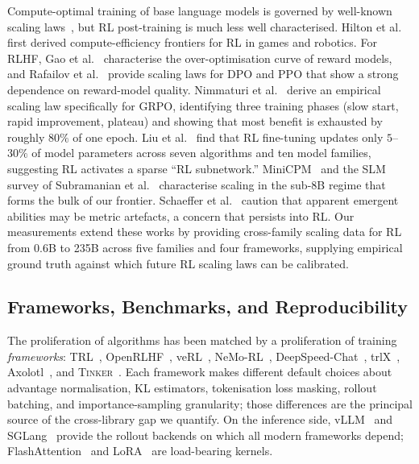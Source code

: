 \documentclass{article}
\newcommand{\tinker}{\textsc{Tinker}}
\begin{document}
Compute-optimal training of base language models is governed by
well-known scaling laws~\cite{kaplan2020scalinglaws, hoffmann2022chinchilla, muennighoff2023datascaling}, but RL post-training is much less well
characterised. Hilton et al.~\cite{hilton2023rlscaling} first derived
compute-efficiency frontiers for RL in games and robotics. For RLHF,
Gao et al.~\cite{gao2023reward} characterise the over-optimisation curve of
reward models, and Rafailov et al.~\cite{rafailov2024rlhfscaling} provide
scaling laws for DPO and PPO that show a strong dependence on reward-model
quality. Nimmaturi et al.~\cite{nimmaturi2025predictive} derive an
empirical scaling law specifically for GRPO, identifying three training
phases (slow start, rapid improvement, plateau) and showing that most
benefit is exhausted by roughly $80\%$ of one epoch. Liu et
al.~\cite{liu2025rlsubnetworks} find that RL fine-tuning updates only
$5$--$30\%$ of model parameters across seven algorithms and ten model
families, suggesting RL activates a sparse ``RL subnetwork.''
MiniCPM~\cite{hu2024minicpm} and the SLM survey of
Subramanian et al.~\cite{subramanian2025slm} characterise scaling in the
sub-8B regime that forms the bulk of our frontier. Schaeffer et
al.~\cite{schaeffer2024emergent} caution that apparent emergent abilities may
be metric artefacts, a concern that persists into RL. Our measurements
extend these works by providing cross-family scaling data for RL from
0.6B to 235B across five families and four frameworks, supplying empirical
ground truth against which future RL scaling laws can be calibrated.

\subsection{Frameworks, Benchmarks, and Reproducibility}
\label{sec:related:frameworks}

The proliferation of algorithms has been matched by a proliferation of
training \emph{frameworks}: TRL~\cite{vonwerra2022trl},
OpenRLHF~\cite{hu2024openrlhf}, veRL~\cite{sheng2024verl},
NeMo-RL~\cite{nvidia2024nemorl}, DeepSpeed-Chat~\cite{yao2023deepspeedchat},
trlX~\cite{havrilla2023trlx}, Axolotl~\cite{axolotl2024}, and
\tinker{}~\cite{thinkingmachines2024tinker}. Each framework makes different
default choices about advantage normalisation, KL estimators, tokenisation
loss masking, rollout batching, and importance-sampling granularity; those
differences are the principal source of the cross-library gap we quantify.
On the inference side, vLLM~\cite{kwon2023vllm} and
SGLang~\cite{zheng2024sglang} provide the rollout backends on which all
modern frameworks depend; FlashAttention~\cite{dao2022flashattention} and
LoRA~\cite{hu2022lora} are load-bearing kernels.
\end{document}

